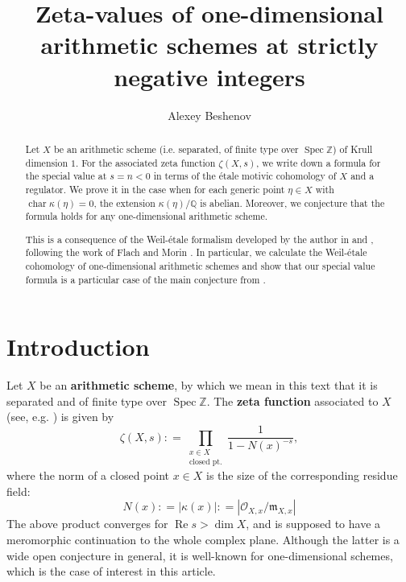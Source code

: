 \documentclass[draft]{article}
\title{Zeta-values of one-dimensional arithmetic schemes at strictly negative integers}
\author{Alexey Beshenov}
\DeclareMathOperator{\fchar}{char}
\DeclareMathOperator{\Spec}{Spec}
\newcommand{\QQ}{\mathbb{Q}}
\newcommand{\ZZ}{\mathbb{Z}}
\renewcommand{\Re}{\operatorname{Re}}
\newcommand{\dfn}{\mathrel{\mathop:}=}
\theoremstyle{myplain}
\theoremstyle{mydefinition}
\numberwithin{equation}{section}
\begin{document}
\maketitle

\begin{abstract}
  Let $X$ be an arithmetic scheme (i.e. separated, of finite type over
  $\Spec \ZZ$) of Krull dimension $1$. For the associated zeta function
  $\zeta (X,s)$, we write down a formula for the special value at $s = n < 0$ in  
  terms of the \'{e}tale motivic cohomology of $X$ and a regulator. We prove it
  in the case when for each generic point $\eta \in X$ with
  $\fchar \kappa (\eta) = 0$, the extension $\kappa (\eta)/\QQ$ is
  abelian. Moreover, we conjecture that the formula holds for any
  one-dimensional arithmetic scheme.

  This is a consequence of the Weil-\'{e}tale formalism developed by the author
  in \cite{Beshenov-Weil-etale-1} and \cite{Beshenov-Weil-etale-2}, following
  the work of Flach and Morin \cite{Flach-Morin-2018}. In particular, we
  calculate the Weil-\'{e}tale cohomology of one-dimensional arithmetic schemes
  and show that our special value formula is a particular case of the main
  conjecture from \cite{Beshenov-Weil-etale-2}.
\end{abstract}



\section{Introduction}

Let $X$ be an \textbf{arithmetic scheme}, by which we mean in this text that it
is separated and of finite type over $\Spec \ZZ$.  The \textbf{zeta function}
associated to $X$ (see, e.g. \cite{Serre-1965}) is given by
\[ \zeta (X,s) \dfn \prod_{\substack{x \in X \\ \text{closed pt.}}}
  \frac{1}{1 - N (x)^{-s}}, \]
where the norm of a closed point $x\in X$ is the size of the corresponding
residue field:
$$N (x) \dfn |\kappa (x)| \dfn |\mathcal{O}_{X,x}/\mathfrak{m}_{X,x}|$$
The above product converges for $\Re s > \dim X$, and is supposed to have a
meromorphic continuation to the whole complex plane. Although the latter is a
wide open conjecture in general, it is well-known for one-dimensional schemes,
which is the case of interest in this article.
\end{document}
